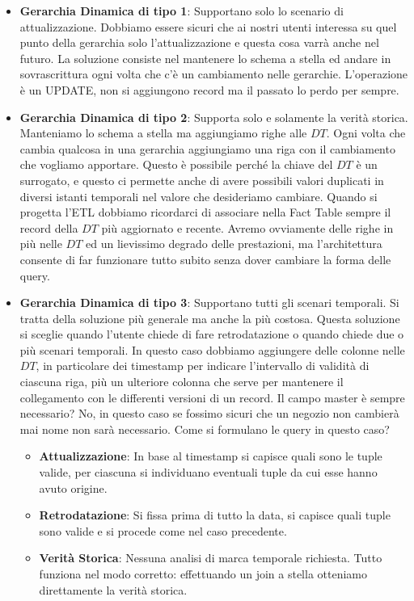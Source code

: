 \begin{itemize}
	\item \textbf{Gerarchia Dinamica di tipo 1}: Supportano solo lo scenario di attualizzazione. Dobbiamo essere sicuri che ai nostri utenti interessa su quel punto della gerarchia solo l'attualizzazione e questa cosa varrà anche nel futuro. La soluzione consiste nel mantenere lo schema a stella ed andare in sovrascrittura ogni volta che c'è un cambiamento nelle gerarchie. L'operazione è un UPDATE, non si aggiungono record ma il passato lo perdo per sempre.
	\item \textbf{Gerarchia Dinamica di tipo 2}: Supporta solo e solamente la verità storica. Manteniamo lo schema a stella ma aggiungiamo righe alle $DT$. Ogni volta che cambia qualcosa in una gerarchia aggiungiamo una riga con il cambiamento che vogliamo apportare. Questo è possibile perché la chiave del $DT$ è un surrogato, e questo ci permette anche di avere possibili valori duplicati in diversi istanti temporali nel valore che desideriamo cambiare.\newline
	Quando si progetta l'ETL dobbiamo ricordarci di associare nella Fact Table sempre il record della $DT$ più aggiornato e recente.\newline
	Avremo ovviamente delle righe in più nelle $DT$ ed un lievissimo degrado delle prestazioni, ma l'architettura consente di far funzionare tutto subito senza dover cambiare la forma delle query.
	\item \textbf{Gerarchia Dinamica di tipo 3}: Supportano tutti gli scenari temporali. Si tratta della soluzione più generale ma anche la più costosa. Questa soluzione si sceglie quando l'utente chiede di fare retrodatazione o quando chiede due o più scenari temporali.\newline
	In questo caso dobbiamo aggiungere delle colonne nelle $DT$, in particolare dei timestamp per indicare l'intervallo di validità di ciascuna riga, più un ulteriore colonna che serve per mantenere il collegamento con le differenti versioni di un record.\newline
	Il campo master è sempre necessario? No, in questo caso se fossimo sicuri che un negozio non cambierà mai nome non sarà necessario.
	Come si formulano le query in questo caso?
	\begin{itemize}
		\item \textbf{Attualizzazione}: In base al timestamp si capisce quali sono le tuple valide, per ciascuna si individuano eventuali tuple da cui esse hanno avuto origine.
		\item \textbf{Retrodatazione}: Si fissa prima di tutto la data, si capisce quali tuple sono valide e si procede come nel caso precedente.
		\item \textbf{Verità Storica}: Nessuna analisi di marca temporale richiesta. Tutto funziona nel modo corretto: effettuando un join a stella otteniamo direttamente la verità storica.
	\end{itemize}
\end{itemize}
